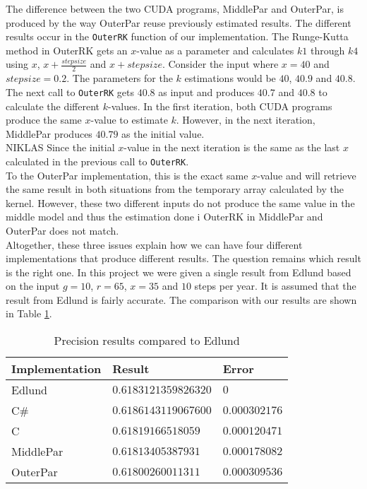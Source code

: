 The difference between the two CUDA programs, MiddlePar and OuterPar, is produced by the way OuterPar reuse previously estimated results. The different results occur in the \texttt{OuterRK} function of our implementation. The Runge-Kutta method in OuterRK gets an $x$-value as a parameter and calculates $k1$ through $k4$ using $x$, $x+\frac{stepsize}{2}$ and $x+stepsize$. Consider the input where $x = 40$ and $stepsize = 0.2$. The parameters for the $k$ estimations would be $40$, $40.9$ and $40.8$. The next call to \texttt{OuterRK} gets $40.8$ as input and produces $40.7$ and $40.8$ to calculate the different $k$-values. In the first iteration, both CUDA programs produce the same $x$-value to estimate $k$. However, in the next iteration, MiddlePar produces $40.79$ as the initial value. \\

NIKLAS
Since the initial $x$-value in the next iteration is the same as the last $x$ calculated in the previous call to \texttt{OuterRK}. \\

To the OuterPar implementation, this is the exact same $x$-value and will retrieve the same result in both situations from the temporary array calculated by the kernel. However, these two different inputs do not produce the same value in the middle model and thus the estimation done i OuterRK in MiddlePar and OuterPar does not match.\\

Altogether, these three issues explain how we can have four different implementations that produce different results. The question remains which result is the right one. In this project we were given a single result from Edlund based on the input $g=10$, $r=65$, $x=35$ and $10$ steps per year. It is assumed that the result from Edlund is fairly accurate. The comparison with our results are shown in Table \ref{table:precision}.

\begin{table}
\begin{center}
\begin{tabular}[ht!]{|l|l|l|}
	\hline
\textbf{Implementation}&\textbf{Result}&\textbf{Error}\\\hline
Edlund&$0.6183121359826320$&$0$\\\hline
C\#&$0.6186143119067600$&$0.000302176$\\\hline
C&$0.61819166518059$&$0.000120471$\\\hline
MiddlePar&$0.61813405387931$&$0.000178082$\\\hline
OuterPar&$0.61800260011311$&$0.000309536$\\\hline
\end{tabular}
\end{center}
\caption{Precision results compared to Edlund}
\label{table:precision}
\end{table}

